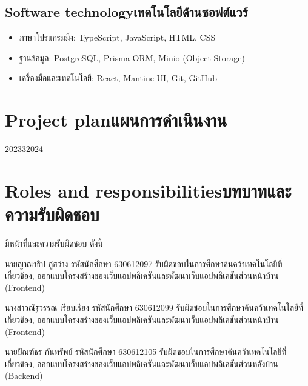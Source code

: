 \subsection{\ifenglish Software technology\else เทคโนโลยีด้านซอฟต์แวร์\fi}
\begin{itemize}
    \item ภาษาโปรแกรมมิ่ง: TypeScript, JavaScript, HTML, CSS
    \item ฐานข้อมูล: PostgreSQL, Prisma ORM, Minio (Object Storage)
    \item เครื่องมือและเทคโนโลยี: React, Mantine UI, Git, GitHub
\end{itemize}

\section{\ifenglish Project plan\else แผนการดำเนินงาน\fi}

\begin{plan}{7}{2023}{3}{2024}
\end{plan}

\section{\ifenglish Roles and responsibilities\else บทบาทและความรับผิดชอบ\fi}
มีหน้าที่และความรับผิดชอบ ดังนี้


นายญาณาธิป ภู่สว่าง รหัสนักศึกษา 630612097 รับผิดชอบในการศึกษาค้นคว้าเทคโนโลยีที่เกี่ยวข้อง, ออกแบบโครงสร้างของเว็บแอปพลิเคชันและพัฒนาเว็บแอปพลิเคชันส่วนหน้าบ้าน (Frontend) 

นางสาวณัฐวรรณ เรียบเรียง รหัสนักศึกษา 630612099 รับผิดชอบในการศึกษาค้นคว้าเทคโนโลยีที่เกี่ยวข้อง, ออกแบบโครงสร้างของเว็บแอปพลิเคชันและพัฒนาเว็บแอปพลิเคชันส่วนหน้าบ้าน (Frontend)

นายปัณฑ์ธร กันทรัพย์ รหัสนักศึกษา 630612105 รับผิดชอบในการศึกษาค้นคว้าเทคโนโลยีที่เกี่ยวข้อง, ออกแบบโครงสร้างของเว็บแอปพลิเคชันและพัฒนาเว็บแอปพลิเคชันส่วนหลังบ้าน (Backend)





